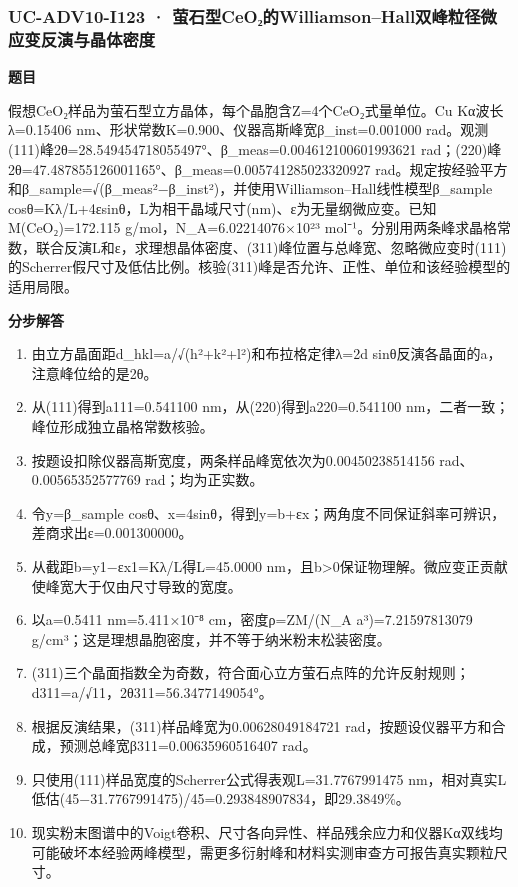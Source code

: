 \documentclass[UTF8,11pt,a4paper]{ctexart}
\begin{document}
\subsubsection*{UC-ADV10-I123 · 萤石型CeO₂的Williamson–Hall双峰粒径微应变反演与晶体密度}
\noindent\textbf{题目}\par
假想CeO₂样品为萤石型立方晶体，每个晶胞含Z=4个CeO₂式量单位。Cu Kα波长λ=0.15406 nm、形状常数K=0.900、仪器高斯峰宽β\_inst=0.001000 rad。观测(111)峰2θ=28.549454718055497°、β\_meas=0.004612100601993621 rad；(220)峰2θ=47.487855126001165°、β\_meas=0.005741285023320927 rad。规定按经验平方和β\_sample=√(β\_meas²−β\_inst²)，并使用Williamson–Hall线性模型β\_sample cosθ=Kλ/L+4εsinθ，L为相干晶域尺寸(nm)、ε为无量纲微应变。已知M(CeO₂)=172.115 g/mol，N\_A=6.02214076×10²³ mol⁻¹。分别用两条峰求晶格常数，联合反演L和ε，求理想晶体密度、(311)峰位置与总峰宽、忽略微应变时(111)的Scherrer假尺寸及低估比例。核验(311)峰是否允许、正性、单位和该经验模型的适用局限。\par
\medskip\noindent\textbf{分步解答}
\begin{enumerate}
\item 由立方晶面距d\_hkl=a/√(h²+k²+l²)和布拉格定律λ=2d sinθ反演各晶面的a，注意峰位给的是2θ。
\item 从(111)得到a111=0.541100 nm，从(220)得到a220=0.541100 nm，二者一致；峰位形成独立晶格常数核验。
\item 按题设扣除仪器高斯宽度，两条样品峰宽依次为0.00450238514156 rad、0.00565352577769 rad；均为正实数。
\item 令y=β\_sample cosθ、x=4sinθ，得到y=b+εx；两角度不同保证斜率可辨识，差商求出ε=0.001300000。
\item 从截距b=y1−εx1=Kλ/L得L=45.0000 nm，且b>0保证物理解。微应变正贡献使峰宽大于仅由尺寸导致的宽度。
\item 以a=0.5411 nm=5.411×10⁻⁸ cm，密度ρ=ZM/(N\_A a³)=7.21597813079 g/cm³；这是理想晶胞密度，并不等于纳米粉末松装密度。
\item (311)三个晶面指数全为奇数，符合面心立方萤石点阵的允许反射规则；d311=a/√11，2θ311=56.3477149054°。
\item 根据反演结果，(311)样品峰宽为0.00628049184721 rad，按题设仪器平方和合成，预测总峰宽β311=0.00635960516407 rad。
\item 只使用(111)样品宽度的Scherrer公式得表观L=31.7767991475 nm，相对真实L低估(45−31.7767991475)/45=0.293848907834，即29.3849\%。
\item 现实粉末图谱中的Voigt卷积、尺寸各向异性、样品残余应力和仪器Kα双线均可能破坏本经验两峰模型，需更多衍射峰和材料实测审查方可报告真实颗粒尺寸。
\end{enumerate}
\end{document}
